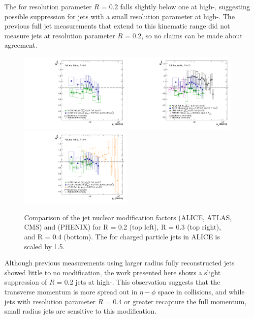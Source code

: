 The \RpPb for resolution parameter $R$ = 0.2 falls slightly below one at high-\pT, suggesting possible suppression for jets with a small resolution parameter at high-\pT. The previous full jet measurements that extend to this kinematic range did not measure jets at resolution parameter $R$ = 0.2, so no claims can be made about agreement.

\begin{figure}[hbt!]
    \centering
    \includegraphics[width=0.49\textwidth]{figures/pPbFigures/RpPb/experimentComp/RpPbCombined_R02.pdf}
    \includegraphics[width=0.49\textwidth]{figures/pPbFigures/RpPb/experimentComp/RpPbCombined_R03.pdf}
    \includegraphics[width=0.49\textwidth]{figures/pPbFigures/RpPb/experimentComp/RpPbCombined_R04.pdf}
    \caption{Comparison of the jet nuclear modification factors \RpPb (ALICE, ATLAS, CMS) and \RdAu (PHENIX) for R = 0.2 (top left), R = 0.3 (top right), and R = 0.4 (bottom). The \pT for charged particle jets in ALICE is scaled by 1.5.}
    \label{fig:RpPbComp}
\end{figure}

Although previous measurements using larger radius fully reconstructed jets showed little to no modification, the work presented here shows a slight suppression of $R$ = 0.2 jets at high-\pT. This observation suggests that the transverse momentum is more spread out in $\eta-\phi$ space in \pPb collisions, and while jets with resolution parameter $R$ = 0.4 or greater recapture the full momentum, small radius jets are sensitive to this modification.

